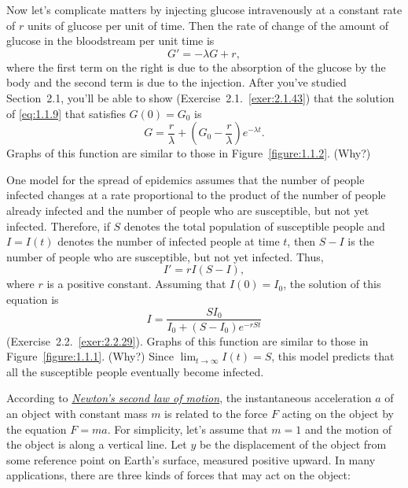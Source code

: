 Now let's complicate matters by injecting glucose intravenously at a constant rate of $r$ units of glucose per unit of time. Then the rate of change of the amount of glucose in the bloodstream per unit time is
\begin{equation}
  \label{eq:1.1.9}G'=-\lambda G+r,
\end{equation}
where the first term on the right is due to the absorption of the glucose by the body and the second term is due to the injection. After you've studied Section~2.1, you'll be able to show (Exercise~2.1.~\hspace*{-3pt}\ref{exer:2.1.43}) that the solution of \eqref{eq:1.1.9} that satisfies $G(0)=G_{0}$ is
\[
  G=\frac{r}{\lambda}+\left(G_{0}-\frac{r}{\lambda}\right)e^{-\lambda t}.
\]
Graphs of this function are similar to those in Figure~\ref{figure:1.1.2}. (Why?)


\noindent
One model for the spread of epidemics assumes that the number of people infected changes at a rate proportional to the product of the number of people already infected and the number of people who are susceptible, but not yet infected. Therefore, if $S$ denotes the total population of susceptible people and $I=I(t)$ denotes the number of infected people at time $t$, then $S-I$ is the number of people who are susceptible, but not yet infected. Thus,
\[
  I'=rI(S-I),
\]
where $r$ is a positive constant. Assuming that $I(0)=I_{0}$, the solution of this equation is
\[
  I=\frac{SI_{0}}{I_{0}+(S-I_{0})e^{-rSt}}
\]
(Exercise~2.2.~\hspace*{-3pt}\ref{exer:2.2.29}). Graphs of this function are similar to those in Figure~\ref{figure:1.1.1}. (Why?) Since $\lim_{t\to\infty}I(t)=S$, this model predicts that all the susceptible people eventually become infected.


\noindent

According to
\href{https://mathshistory.st-andrews.ac.uk/Biographies/Newton/}{\color{blue}
\it Newton's second law of motion}, the instantaneous acceleration $a$ of an object with constant mass $m$ is related to the force $F$ acting on the object by the equation $F=ma$. For simplicity, let's assume that $m=1$ and the motion of the object is along a vertical line. Let $y$ be the displacement of the object from some reference point on Earth's surface, measured positive upward. In many applications, there are three kinds of forces that may act on the object:

